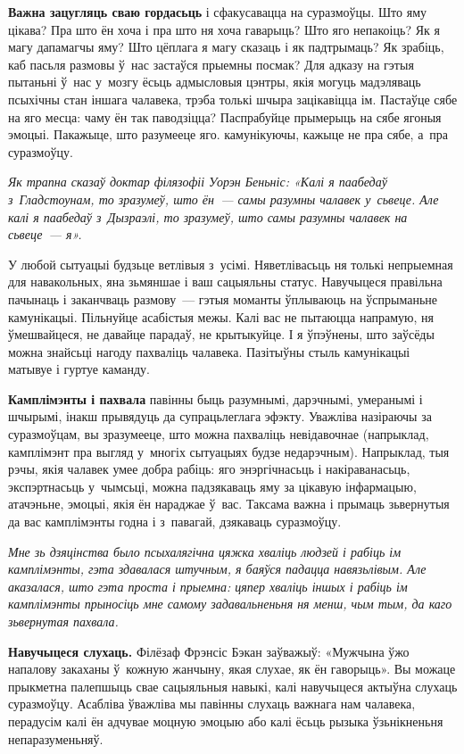 \textbf{Важна зацугляць сваю гордасьць} і сфакусавацца на суразмоўцы. Што яму цікава? Пра што ён хоча і пра што ня хоча гаварыць? Што яго непакоіць? Як я магу дапамагчы яму? Што цёплага я магу сказаць і як падтрымаць? Як зрабіць, каб пасьля размовы ў~нас застаўся прыемны посмак? Для адказу на гэтыя пытаньні ў~нас у~мозгу ёсьць адмысловыя цэнтры, якія могуць мадэляваць псыхічны стан іншага чалавека, трэба толькі шчыра зацікавіцца ім. Пастаўце сябе на яго месца: чаму ён так паводзіцца? Паспрабуйце прымерыць на сябе ягоныя эмоцыі. Пакажыце, што разумееце яго. камунікуючы, кажыце не пра сябе, а~пра суразмоўцу.

\emph{Як трапна сказаў доктар філязофіі Уорэн Беньніс: «Калі я паабедаў з~Гладстоунам, то зразумеў, што ён~--- самы разумны чалавек у~сьвеце. Але калі я паабедаў з~Дызраэлі, то зразумеў, што самы разумны чалавек на сьвеце~--- я».}

У любой сытуацыі будзьце ветлівыя з~усімі. Няветлівасьць ня толькі непрыемная для навакольных, яна зьмяншае і ваш сацыяльны статус. Навучыцеся правільна пачынаць і заканчваць размову~--- гэтыя моманты ўплываюць на ўспрыманьне камунікацыі. Пільнуйце асабістыя межы. Калі вас не пытаюцца напрамую, ня ўмешвайцеся, не давайце парадаў, не крытыкуйце. І я ўпэўнены, што заўсёды можна знайсьці нагоду пахваліць чалавека. Пазітыўны стыль камунікацыі матывуе і гуртуе каманду.

\textbf{Камплімэнты і пахвала} павінны быць разумнымі, дарэчнымі, умеранымі і шчырымі, інакш прывядуць да супрацьлеглага эфэкту. Уважліва назіраючы за суразмоўцам, вы зразумееце, што можна пахваліць невідавочнае (напрыклад, камплімэнт пра выгляд у~многіх сытуацыях будзе недарэчным). Напрыклад, тыя рэчы, якія чалавек умее добра рабіць: яго энэргічнасьць і накіраванасьць, экспэртнасьць у~чымсьці, можна падзякаваць яму за цікавую інфармацыю, атачэньне, эмоцыі, якія ён нараджае ў~вас. Таксама важна і прымаць зьвернутыя да вас камплімэнты годна і з~павагай, дзякаваць суразмоўцу.

\emph{Мне зь дзяцінства было псыхалягічна цяжка хваліць людзей і рабіць ім камплімэнты, гэта здавалася штучным, я баяўся падацца навязьлівым. Але аказалася, што гэта проста і прыемна: цяпер хваліць іншых і рабіць ім камплімэнты прыносіць мне самому задавальненьня ня менш, чым тым, да каго зьвернутая пахвала.}

\textbf{Навучыцеся слухаць.} Філёзаф Фрэнсіс Бэкан заўважыў: «Мужчына ўжо напалову закаханы ў~кожную жанчыну, якая слухае, як ён гаворыць». Вы можаце прыкметна палепшыць свае сацыяльныя навыкі, калі навучыцеся актыўна слухаць суразмоўцу. Асабліва ўважліва мы павінны слухаць важнага нам чалавека, перадусім калі ён адчувае моцную эмоцыю або калі ёсьць рызыка ўзьнікненьня непаразуменьняў.

